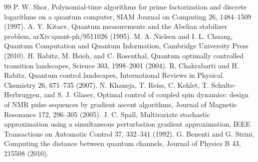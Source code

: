 \documentclass[11pt]{article}
\begin{document}
\small
\begin{thebibliography}{99}
P. W. Shor, Polynomial-time algorithms for prime factorization and discrete
logarithms on a quantum computer, SIAM Journal on Computing 26, 1484--1509
(1997).
A. Y. Kitaev, Quantum measurements and the Abelian stabilizer problem,
arXiv:quant-ph/9511026 (1995).
M. A. Nielsen and I. L. Chuang, Quantum Computation and Quantum Information,
Cambridge University Press (2010).
H. Rabitz, M. Hsieh, and C. Rosenthal, Quantum optimally controlled transition
landscapes, Science 303, 1998--2001 (2004).
R. Chakrabarti and H. Rabitz, Quantum control landscapes, International
Reviews in Physical Chemistry 26, 671--735 (2007).
N. Khaneja, T. Reiss, C. Kehlet, T. Schulte-Herbruggen, and S. J. Glaser,
Optimal control of coupled spin dynamics: design of NMR pulse sequences by
gradient ascent algorithms, Journal of Magnetic Resonance 172, 296--305
(2005).
J. C. Spall, Multivariate stochastic approximation using a simultaneous
perturbation gradient approximation, IEEE Transactions on Automatic Control
37, 332--341 (1992).
G. Benenti and G. Strini, Computing the distance between quantum channels,
Journal of Physics B 43, 215508 (2010).
\end{thebibliography}
\normalsize
\end{document}
